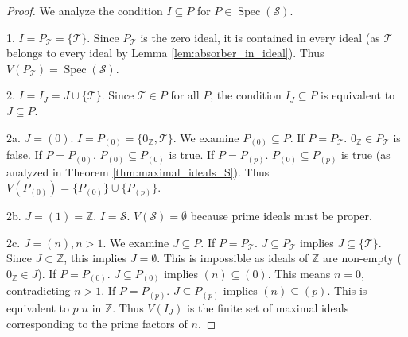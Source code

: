 \documentclass[11pt, a4paper]{article}
\theoremstyle{plain}
\theoremstyle{definition}
\numberwithin{equation}{section}
\newcommand{\Z}{\mathbb{Z}}
\newcommand{\Tobj}{\mathcal{T}} %
\newcommand{\SemiringS}{\mathcal{S}}
\DeclareMathOperator{\Spec}{Spec}
\begin{document}
\begin{proof}
We analyze the condition $I \subseteq P$ for $P \in \Spec(\SemiringS)$.

1. $I=P_{\Tobj}=\{\Tobj\}$. Since $P_{\Tobj}$ is the zero ideal, it is contained in every ideal (as $\Tobj$ belongs to every ideal by Lemma \ref{lem:absorber_in_ideal}). Thus $V(P_{\Tobj}) = \Spec(\SemiringS)$.

2. $I=I_J = J \cup \{\Tobj\}$. Since $\Tobj \in P$ for all $P$, the condition $I_J \subseteq P$ is equivalent to $J \subseteq P$.

2a. $J=(0)$. $I=P_{(0)}=\{0_{\Z}, \Tobj\}$.
We examine $P_{(0)} \subseteq P$.
If $P=P_{\Tobj}$. $0_{\Z} \in P_{\Tobj}$ is false.
If $P=P_{(0)}$. $P_{(0)} \subseteq P_{(0)}$ is true.
If $P=P_{(p)}$. $P_{(0)} \subseteq P_{(p)}$ is true (as analyzed in Theorem \ref{thm:maximal_ideals_S}).
Thus $V(P_{(0)}) = \{P_{(0)}\} \cup \{P_{(p)}\}$.

2b. $J=(1)=\Z$. $I=\SemiringS$. $V(\SemiringS) = \emptyset$ because prime ideals must be proper.

2c. $J=(n), n>1$.
We examine $J \subseteq P$.
If $P=P_{\Tobj}$. $J \subseteq P_{\Tobj}$ implies $J \subseteq \{\Tobj\}$. Since $J \subset \Z$, this implies $J=\emptyset$. This is impossible as ideals of $\Z$ are non-empty ($0_{\Z} \in J$).
If $P=P_{(0)}$. $J \subseteq P_{(0)}$ implies $(n) \subseteq (0)$. This means $n=0$, contradicting $n>1$.
If $P=P_{(p)}$. $J \subseteq P_{(p)}$ implies $(n) \subseteq (p)$. This is equivalent to $p|n$ in $\Z$.
Thus $V(I_J)$ is the finite set of maximal ideals corresponding to the prime factors of $n$.
\end{proof}
\end{document}

